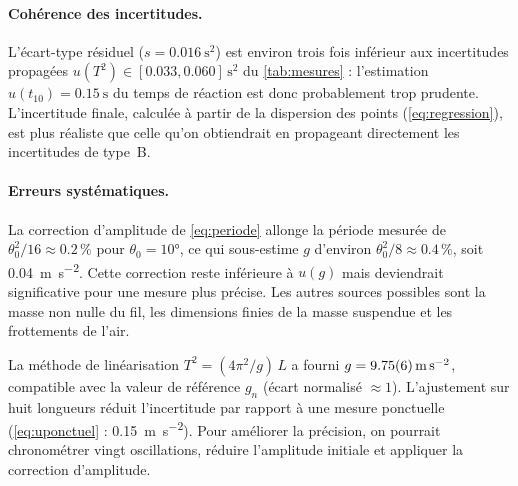 \begin{analyse}
\paragraph{Cohérence des incertitudes.}
L'écart-type résiduel ($s=\qty{0.016}{\second\squared}$) est environ trois fois
inférieur aux incertitudes propagées $u(T^{2})\in[\num{0.033},\num{0.060}]\,\unit{\second\squared}$
du \cref{tab:mesures} : l'estimation $u(t_{10})=\qty{0.15}{\second}$ du temps
de réaction est donc probablement trop prudente. L'incertitude finale, calculée
à partir de la dispersion des points (\cref{eq:regression}), est plus
réaliste que celle qu'on obtiendrait en propageant directement les
incertitudes de type~B.

\paragraph{Erreurs systématiques.}
La correction d'amplitude de \cref{eq:periode} allonge la période mesurée de
$\theta_{0}^{2}/16\approx\num{0.2}\,\%$ pour $\theta_{0}=\ang{10}$, ce qui
sous-estime $g$ d'environ $\theta_{0}^{2}/8\approx\num{0.4}\,\%$, soit
\qty{0.04}{\metre\per\second\squared}. Cette correction reste inférieure à
$u(g)$ mais deviendrait significative pour une mesure plus précise. Les
autres sources possibles sont la masse non nulle du fil, les dimensions finies
de la masse suspendue et les frottements de l'air.
\end{analyse}

\begin{conclusion}
La méthode de linéarisation $T^{2}=(4\pi^{2}/g)\,L$ a fourni
$g=\qty{9.75 +- 0.06}{\metre\per\second\squared}$, compatible avec la valeur
de référence $g_{n}$ (écart normalisé $\approx1$). L'ajustement sur huit longueurs
réduit l'incertitude par rapport à une mesure ponctuelle
(\cref{eq:uponctuel} : \qty{0.15}{\metre\per\second\squared}). Pour améliorer
la précision, on pourrait chronométrer vingt oscillations, réduire l'amplitude
initiale et appliquer la correction d'amplitude.
\end{conclusion}
